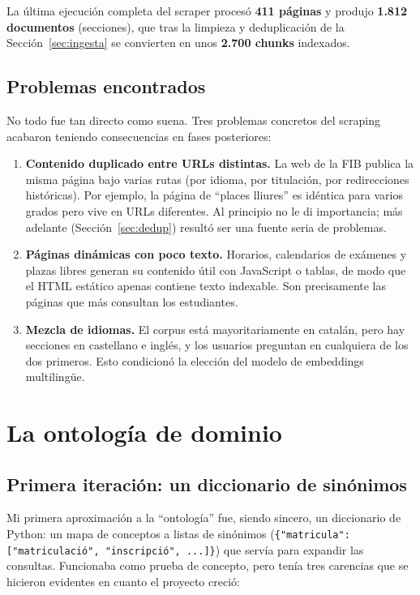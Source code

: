 \documentclass[12pt, a4paper, twoside]{report}
\begin{document}
La \'ultima ejecuci\'on completa del scraper proces\'o \textbf{411 p\'aginas} y produjo \textbf{1.812 documentos} (secciones), que tras la limpieza y deduplicaci\'on de la Secci\'on~\ref{sec:ingesta} se convierten en unos \textbf{2.700 chunks} indexados.

\subsection{Problemas encontrados}

No todo fue tan directo como suena. Tres problemas concretos del scraping acabaron teniendo consecuencias en fases posteriores:

\begin{enumerate}
  \item \textbf{Contenido duplicado entre URLs distintas.} La web de la FIB publica la misma p\'agina bajo varias rutas (por idioma, por titulaci\'on, por redirecciones hist\'oricas). Por ejemplo, la p\'agina de ``places lliures'' es id\'entica para varios grados pero vive en URLs diferentes. Al principio no le di importancia; m\'as adelante (Secci\'on~\ref{sec:dedup}) result\'o ser una fuente seria de problemas.
  \item \textbf{P\'aginas din\'amicas con poco texto.} Horarios, calendarios de ex\'amenes y plazas libres generan su contenido \'util con JavaScript o tablas, de modo que el HTML est\'atico apenas contiene texto indexable. Son precisamente las p\'aginas que m\'as consultan los estudiantes.
  \item \textbf{Mezcla de idiomas.} El corpus est\'a mayoritariamente en catal\'an, pero hay secciones en castellano e ingl\'es, y los usuarios preguntan en cualquiera de los dos primeros. Esto condicion\'o la elecci\'on del modelo de embeddings multiling\"ue.
\end{enumerate}

\section{La ontolog\'ia de dominio}
\label{sec:ontologia}

\subsection{Primera iteraci\'on: un diccionario de sin\'onimos}

Mi primera aproximaci\'on a la ``ontolog\'ia'' fue, siendo sincero, un diccionario de Python: un mapa de conceptos a listas de sin\'onimos (\texttt{\{"matricula": ["matriculaci\'o", "inscripci\'o", ...]\}}) que serv\'ia para expandir las consultas. Funcionaba como prueba de concepto, pero ten\'ia tres carencias que se hicieron evidentes en cuanto el proyecto creci\'o:
\end{document}
